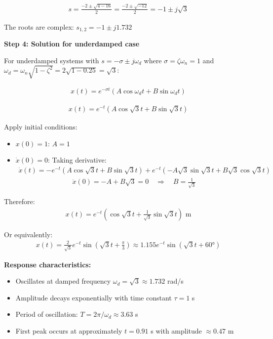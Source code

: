 \documentclass[11pt,a4paper]{article}
\begin{document}
\begin{align}
s = \frac{-2 \pm \sqrt{4-16}}{2} = \frac{-2 \pm \sqrt{-12}}{2} = -1 \pm j\sqrt{3}
\end{align}

The roots are complex: $s_{1,2} = -1 \pm j1.732$

\textbf{Step 4: Solution for underdamped case}

For underdamped systems with $s = -\sigma \pm j\omega_d$ where $\sigma = \zeta\omega_n = 1$ and $\omega_d = \omega_n\sqrt{1-\zeta^2} = 2\sqrt{1-0.25} = \sqrt{3}$:

\begin{align}
x(t) = e^{-\sigma t}(A\cos\omega_d t + B\sin\omega_d t)
\end{align}

\begin{align}
x(t) = e^{-t}(A\cos\sqrt{3}t + B\sin\sqrt{3}t)
\end{align}

Apply initial conditions:
\begin{itemize}
\item $x(0) = 1$: $A = 1$
\item $\dot{x}(0) = 0$: Taking derivative:
\begin{align}
\dot{x}(t) = -e^{-t}(A\cos\sqrt{3}t + B\sin\sqrt{3}t) + e^{-t}(-A\sqrt{3}\sin\sqrt{3}t + B\sqrt{3}\cos\sqrt{3}t)
\end{align}
\begin{align}
\dot{x}(0) = -A + B\sqrt{3} = 0 \quad \Rightarrow \quad B = \frac{1}{\sqrt{3}}
\end{align}
\end{itemize}

Therefore:
\begin{align}
x(t) = e^{-t}\left(\cos\sqrt{3}t + \frac{1}{\sqrt{3}}\sin\sqrt{3}t\right) \text{ m}
\end{align}

Or equivalently:
\begin{align}
x(t) = \frac{2}{\sqrt{3}}e^{-t}\sin\left(\sqrt{3}t + \frac{\pi}{3}\right) \approx 1.155e^{-t}\sin(\sqrt{3}t + 60°)
\end{align}

\textbf{Response characteristics:}
\begin{itemize}
\item Oscillates at damped frequency $\omega_d = \sqrt{3} \approx 1.732$ rad/s
\item Amplitude decays exponentially with time constant $\tau = 1$ s
\item Period of oscillation: $T = 2\pi/\omega_d \approx 3.63$ s
\item First peak occurs at approximately $t = 0.91$ s with amplitude $\approx 0.47$ m
\end{itemize}
\end{document}

